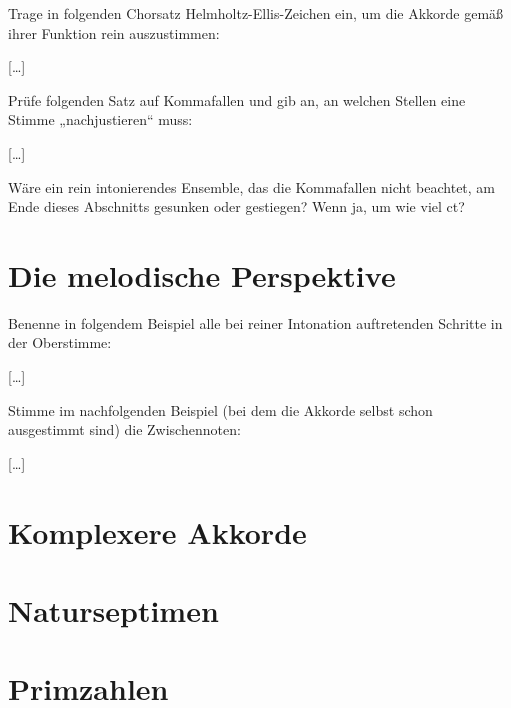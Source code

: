 \documentclass[ngerman,11pt]{scrartcl}
\begin{document}
\begin{aufg}
  Trage in folgenden Chorsatz Helmholtz-Ellis-Zeichen ein, um die Akkorde gemäß
  ihrer Funktion rein auszustimmen:
  \begin{center}
    […]
  \end{center}
\end{aufg}

\begin{aufg}
  Prüfe folgenden Satz auf Kommafallen und gib an, an welchen Stellen eine
  Stimme „nachjustieren“ muss:
  \begin{center}
    […]
  \end{center}
  Wäre ein rein intonierendes Ensemble, das die Kommafallen nicht beachtet, am
  Ende dieses Abschnitts gesunken oder gestiegen? Wenn ja, um wie viel ct?
\end{aufg}

\section{Die melodische Perspektive}

\begin{aufg}
  Benenne in folgendem Beispiel alle bei reiner Intonation auftretenden Schritte
  in der Oberstimme:
  \begin{center}
    […]
  \end{center}
\end{aufg}


\begin{aufg}
  Stimme im nachfolgenden Beispiel (bei dem die Akkorde selbst schon ausgestimmt
  sind) die Zwischennoten:
  \begin{center}
    […]
  \end{center}
\end{aufg}

\section{Komplexere Akkorde}

\section{Naturseptimen}

\appendix
\section{Primzahlen}
\end{document}
